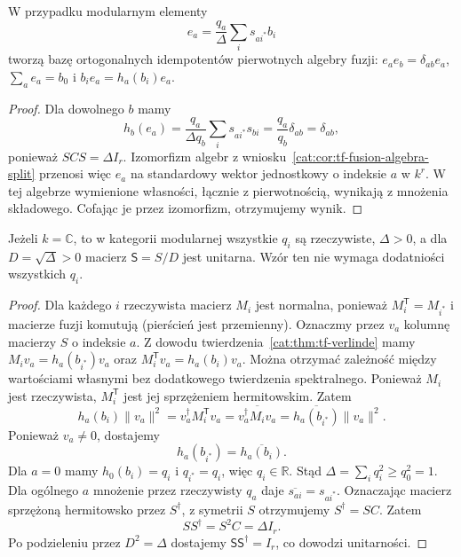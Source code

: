 \begin{wniosek}\label{cat:cor:tf-fusion-idempotents}
W przypadku modularnym elementy
\[
 e_a=\frac{q_a}{\Delta}\sum_i s_{ai^*}b_i
\]
tworzą bazę ortogonalnych idempotentów pierwotnych algebry fuzji: $e_ae_b=\delta_{ab}e_a$, $\sum_a e_a=b_0$ i $b_i e_a=h_a(b_i)e_a$.
\end{wniosek}
\begin{proof}
Dla dowolnego $b$ mamy
\[
 h_b(e_a)=\frac{q_a}{\Delta q_b}\sum_i s_{ai^*}s_{bi}
 =\frac{q_a}{q_b}\delta_{ab}=\delta_{ab},
\]
ponieważ $SCS=\Delta I_r$. Izomorfizm algebr z wniosku~\ref{cat:cor:tf-fusion-algebra-split} przenosi więc $e_a$ na standardowy wektor jednostkowy o indeksie $a$ w $k^r$. W tej algebrze wymienione własności, łącznie z pierwotnością, wynikają z mnożenia składowego. Cofając je przez izomorfizm, otrzymujemy wynik.
\end{proof}

\begin{stwierdzenie}\label{cat:prop:tf-s-unitary}
Jeżeli $k=\mathbb C$, to w kategorii modularnej wszystkie $q_i$ są rzeczywiste, $\Delta>0$, a dla $D=\sqrt{\Delta}>0$ macierz $\mathsf S=S/D$ jest unitarna. Wzór ten nie wymaga dodatniości wszystkich $q_i$.
\end{stwierdzenie}
\begin{proof}
Dla każdego $i$ rzeczywista macierz $M_i$ jest normalna, ponieważ $M_i^{\mathsf T}=M_{i^*}$ i macierze fuzji komutują (pierścień jest przemienny). Oznaczmy przez $v_a$ kolumnę macierzy $S$ o indeksie $a$. Z dowodu twierdzenia~\ref{cat:thm:tf-verlinde} mamy $M_i v_a=h_a(b_{i^*})v_a$ oraz $M_i^{\mathsf T}v_a=h_a(b_i)v_a$. Można otrzymać zależność między wartościami własnymi bez dodatkowego twierdzenia spektralnego. Ponieważ $M_i$ jest rzeczywista, $M_i^{\mathsf T}$ jest jej sprzężeniem hermitowskim. Zatem
\[
 h_a(b_i)\|v_a\|^2
 =v_a^\dagger M_i^{\mathsf T}v_a
 =\overline{v_a^\dagger M_i v_a}
 =\overline{h_a(b_{i^*})}\|v_a\|^2.
\]
Ponieważ $v_a\neq0$, dostajemy
\[
 h_a(b_{i^*})=\overline{h_a(b_i)}.
\]
Dla $a=0$ mamy $h_0(b_i)=q_i$ i $q_{i^*}=q_i$, więc $q_i\in\mathbb R$. Stąd $\Delta=\sum_i q_i^2\geq q_0^2=1$. Dla ogólnego $a$ mnożenie przez rzeczywisty $q_a$ daje $\overline{s_{ai}}=s_{ai^*}$. Oznaczając macierz sprzężoną hermitowsko przez $S^\dagger$, z symetrii $S$ otrzymujemy $S^\dagger=SC$. Zatem
\[
 SS^\dagger=S^2 C=\Delta I_r.
\]
Po podzieleniu przez $D^2=\Delta$ dostajemy $\mathsf S\mathsf S^\dagger=I_r$, co dowodzi unitarności.
\end{proof}

